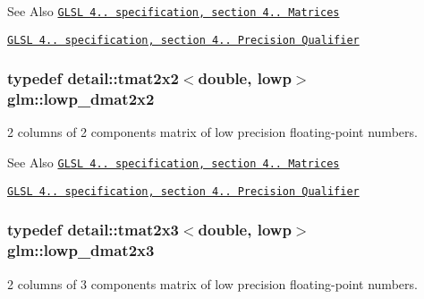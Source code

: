 \begin{DoxySeeAlso}{See Also}
\href{http://www.opengl.org/registry/doc/GLSLangSpec.4.20.8.pdf}{\tt G\-L\-S\-L 4.. specification, section 4.. Matrices} 

\href{http://www.opengl.org/registry/doc/GLSLangSpec.4.20.8.pdf}{\tt G\-L\-S\-L 4.. specification, section 4.. Precision Qualifier} 
\end{DoxySeeAlso}
\hypertarget{group__core__precision_ga68b486ff22814c1a3781378513a9fcc0}{
\subsubsection[{lowp\-\_\-dmat2x2}]{\setlength{\rightskip}{0pt plus 5cm}typedef detail\-::tmat2x2$<$double, lowp$>$ {\bf glm\-::lowp\-\_\-dmat2x2}}}\label{group__core__precision_ga68b486ff22814c1a3781378513a9fcc0}
2 columns of 2 components matrix of low precision floating-\/point numbers.

\begin{DoxySeeAlso}{See Also}
\href{http://www.opengl.org/registry/doc/GLSLangSpec.4.20.8.pdf}{\tt G\-L\-S\-L 4.. specification, section 4.. Matrices} 

\href{http://www.opengl.org/registry/doc/GLSLangSpec.4.20.8.pdf}{\tt G\-L\-S\-L 4.. specification, section 4.. Precision Qualifier} 
\end{DoxySeeAlso}
\hypertarget{group__core__precision_ga2c7432984a35cf72050870a54485ef35}{
\subsubsection[{lowp\-\_\-dmat2x3}]{\setlength{\rightskip}{0pt plus 5cm}typedef detail\-::tmat2x3$<$double, lowp$>$ {\bf glm\-::lowp\-\_\-dmat2x3}}}\label{group__core__precision_ga2c7432984a35cf72050870a54485ef35}
2 columns of 3 components matrix of low precision floating-\/point numbers.


